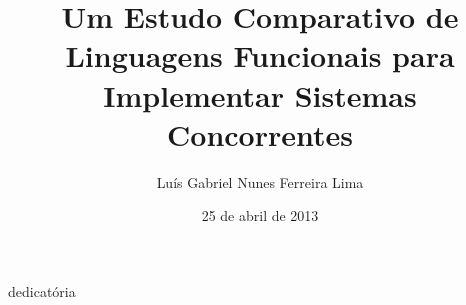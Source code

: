\documentclass[bsc,oneside]{ufpethesis/ufpethesis}
\title{Um Estudo Comparativo de Linguagens Funcionais para Implementar Sistemas Concorrentes}
\author{Luís Gabriel Nunes Ferreira Lima}
\date{25 de abril de 2013}
\institute{Centro de Informática}
\begin{document}
\frontmatter

\frontpage

\presentationpage

\begin{dedicatory}
dedicatória
\end{dedicatory}

\acknowledgements


\resumo


\abstract


\tableofcontents

\listoffigures

\mainmatter









\backmatter

\nocite{*}


\end{document}

